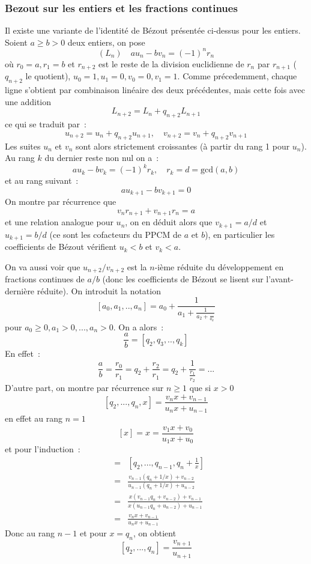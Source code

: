 \documentclass[a4paper,11pt]{article}
\begin{document}
\begin{giacjshere}
\subsubsection{Bezout sur les entiers et les fractions continues}
Il existe une variante de l'identit\'e de B\'ezout pr\'esent\'ee
ci-dessus pour les entiers. Soient $a\geq b>0$ deux entiers, on pose
$$ (L_n) \quad a u_n - b v_n = (-1)^n r_n $$ 
o\`u $r_0=a, r_1=b$ et $r_{n+2}$ est le reste de la division
euclidienne de $r_n$ par $r_{n+1}$ ($q_{n+2}$ le quotient), $u_0=1, u_1=0, v_0=0,v_1=1$.
Comme pr\'ecedemment, chaque ligne s'obtient par combinaison
lin\'eaire des deux pr\'ec\'edentes, mais cette fois avec une addition
$$ L_{n+2}=L_n+q_{n+2} L_{n+1}$$ 
ce qui se traduit par~:
$$ u_{n+2}=u_n+q_{n+2} u_{n+1}, \quad v_{n+2}=v_n+q_{n+2} v_{n+1}$$
Les suites $u_n$ et $v_n$ sont alors strictement croissantes (\`a
partir du rang 1 pour $u_n$). Au rang $k$ du dernier reste non nul on
a~:
$$ a u_k - b v_k = (-1)^k r_k, \quad r_k=d=\mbox{gcd}(a,b)$$
et au rang suivant~:
$$ au_{k+1} -b v_{k+1}=0$$
On montre par r\'ecurrence que
$$ v_n r_{n+1} + v_{n+1} r_n=a$$
et une relation analogue pour $u_n$, on en d\'eduit alors que
$v_{k+1}=a/d$ et $u_{k+1}=b/d$ (ce sont les cofacteurs du PPCM de $a$
et $b$), 
en particulier les coefficients de
B\'ezout v\'erifient $u_k<b$ et $v_k<a$.

On va aussi voir que $u_{n+2}/v_{n+2}$ est la $n$-i\`eme r\'eduite du
d\'eveloppement
en fractions continues de $a/b$ (donc les coefficients de B\'ezout
se lisent sur l'avant-derni\`ere r\'eduite). On introduit la notation
$$[a_0,a_1,..,a_n] =a_0+\frac{1}{a_1+\frac{1}{a_2+\frac{...}{a_k}}}$$
pour $a_0 \geq 0, a_1>0, ..., a_n>0$.
On a alors~:
$$ \frac{a}{b}=[q_2,q_3,..,q_k]$$
En effet~:
$$ \frac{a}{b}= \frac{r_0}{r_1}=q_2 +\frac{r_2}{r_1} = q_2 +
\frac{1}{\frac{r_1}{r_2}} = ...$$
D'autre part, on montre par r\'ecurrence sur $n\geq 1$ que si $x>0$
$$ [q_2,..., q_n,x]=\frac{v_{n}x+v_{n-1}}{u_{n}x+u_{n-1}}$$
en effet au rang $n=1$
$$ [x]=x=\frac{v_1 x + v_0}{u_1 x+u_0 }$$
et pour l'induction~:
\begin{eqnarray*}
  [q_2,..., q_n,x] &= & [q_2,..., q_{n-1},q_n+\frac{1}{x}] \\
&=& \frac{v_{n-1}(q_n+1/x)+v_{n-2}}{u_{n-1}(q_n+1/x)+u_{n-2}} \\
&=&
\frac{x(v_{n-1}q_n+v_{n-2})+v_{n-1}}{x(u_{n-1}q_n+u_{n-2})+u_{n-1}} \\
& = & 
\frac{v_{n}x+v_{n-1}}{u_{n}x+u_{n-1}}
\end{eqnarray*}
Donc au rang $n-1$ et pour $x=q_{n}$, on obtient 
$$ [q_2,..., q_n]=\frac{v_{n+1}}{u_{n+1}}$$


\end{giacjshere}
\end{document}

